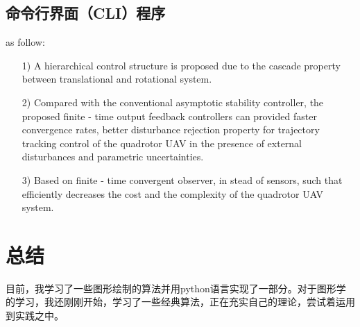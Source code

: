 \documentclass[a4paper,UTF8]{article}
\theoremstyle{definition}
\begin{document}
\subsection{命令行界面（CLI）程序}
as follow:
\begin{itemize}
  \item [1)] 
  A hierarchical control structure is proposed due to the cascade property between translational and rotational system.       
  \item [2)]
  Compared with the conventional asymptotic stability controller, the proposed finite - time output feedback controllers can provided faster convergence rates, better disturbance rejection property for trajectory tracking control of the quadrotor UAV in the presence of external disturbances and parametric uncertainties. 
  \item [3)]
  Based on finite - time convergent observer, in stead of sensors, such that efficiently decreases the cost and the complexity of the quadrotor UAV system.
\end{itemize}
\section{总结}
目前，我学习了一些图形绘制的算法并用python语言实现了一部分。对于图形学的学习，我还刚刚开始，学习了一些经典算法，正在充实自己的理论，尝试着运用到实践之中。
%



%
%
\end{document}
